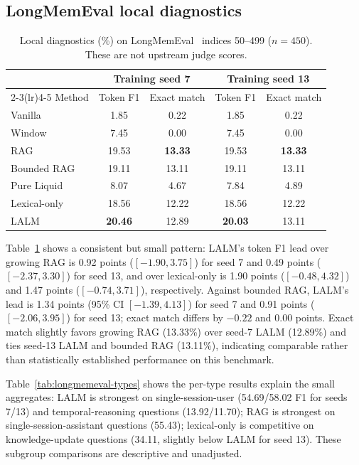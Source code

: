 \documentclass[conference]{IEEEtran}
\begin{document}
\subsection{LongMemEval local diagnostics}
\begin{table}[t]
\centering
\small
\caption{Local diagnostics (\%) on LongMemEval~\cite{wu2024longmemeval} indices 50--499 ($n=450$).
These are not upstream judge scores.}
\label{tab:longmemeval}
\begin{tabular}{lcccc}
\toprule
& \multicolumn{2}{c}{Training seed 7}
& \multicolumn{2}{c}{Training seed 13} \\
\cmidrule(lr){2-3}\cmidrule(lr){4-5}
Method & Token F1 & Exact match & Token F1 & Exact match \\
\midrule
Vanilla      & 1.85 & 0.22 & 1.85 & 0.22 \\
Window       & 7.45 & 0.00 & 7.45 & 0.00 \\
RAG          & 19.53 & \textbf{13.33} & 19.53 & \textbf{13.33} \\
Bounded RAG  & 19.11 & 13.11 & 19.11 & 13.11 \\
Pure Liquid  & 8.07 & 4.67 & 7.84 & 4.89 \\
Lexical-only & 18.56 & 12.22 & 18.56 & 12.22 \\
LALM         & \textbf{20.46} & 12.89 & \textbf{20.03} & 13.11 \\
\bottomrule
\end{tabular}
\end{table}

Table~\ref{tab:longmemeval} shows a consistent but small pattern: LALM's token F1 lead over growing RAG is 0.92 points ($[-1.90,3.75]$) for seed 7 and 0.49 points ($[-2.37,3.30]$) for seed 13, and over lexical-only is 1.90 points ($[-0.48,4.32]$) and 1.47 points ($[-0.74,3.71]$), respectively. Against bounded RAG, LALM's lead is 1.34 points (95\% CI $[-1.39,4.13]$) for seed 7 and 0.91 points ($[-2.06,3.95]$) for seed 13; exact match differs by $-0.22$ and 0.00 points. Exact match slightly favors growing RAG (13.33\%) over seed-7 LALM (12.89\%) and ties seed-13 LALM and bounded RAG (13.11\%), indicating comparable rather than statistically established performance on this benchmark.

Table~\ref{tab:longmemeval-types} shows the per-type results explain the small aggregates: LALM is strongest on single-session-user (54.69/58.02 F1 for seeds 7/13) and temporal-reasoning questions (13.92/11.70); RAG is strongest on single-session-assistant questions (55.43); lexical-only is competitive on knowledge-update questions (34.11, slightly below LALM for seed 13). These subgroup comparisons are descriptive and unadjusted.
\end{document}
